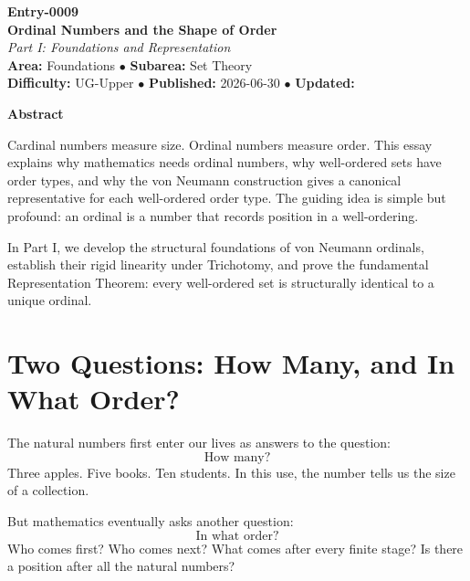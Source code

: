 \documentclass[11pt]{article}
\begin{document}
\begin{center}
{\normalsize \textbf{Entry-0009}}\\[1.0em]
{\Large \textbf{Ordinal Numbers and the Shape of Order}\\[0.4em]
\large \textit{Part I: Foundations and Representation}}\\[0.8em]

\textbf{Area:} Foundations \quad $\bullet$ \quad
\textbf{Subarea:} Set Theory\\[0.35em]
\textbf{Difficulty:} UG-Upper \quad $\bullet$ \quad
\textbf{Published:} 2026-06-30 \quad $\bullet$ \quad
\textbf{Updated:}
\end{center}

\vspace{1.2em}

\noindent
\textbf{Abstract} 
\begin{center}
\begin{minipage}{0.85\textwidth}
\small 
Cardinal numbers measure size. Ordinal numbers measure order. This essay explains why mathematics needs ordinal numbers, why well-ordered sets have order types, and why the von Neumann construction gives a canonical representative for each well-ordered order type. The guiding idea is simple but profound: an ordinal is a number that records position in a well-ordering.

In Part I, we develop the structural foundations of von Neumann ordinals, establish their rigid linearity under Trichotomy, and prove the fundamental Representation Theorem: every well-ordered set is structurally identical to a unique ordinal.
\end{minipage}
\end{center}

\vspace{1.5em}


\section{Two Questions: How Many, and In What Order?}
The natural numbers first enter our lives as answers to the question:
\[
\text{How many?}
\]
Three apples. Five books. Ten students. In this use, the number tells us the size of a collection.

But mathematics eventually asks another question:
\[
\text{In what order?}
\]
Who comes first? Who comes next? What comes after every finite stage? Is there a position after all the natural numbers?
\end{document}
